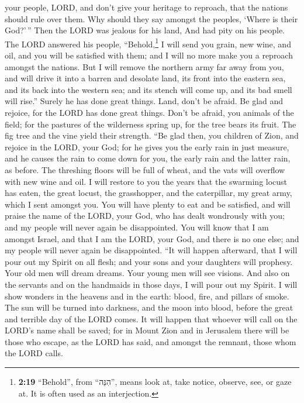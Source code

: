 your people, LORD, and don't give your heritage to reproach, that the
nations should rule over them. Why should they say amongst the peoples,
`Where is their God?'\,''  Then the LORD was jealous for
his land, And had pity on his people.  The LORD answered
his people, ``Behold,\footnote{\textbf{2:19} ``Behold'', from
  ``הִנֵּה'', means look at, take notice, observe, see, or gaze at. It
  is often used as an interjection.} I will send you grain, new wine,
and oil, and you will be satisfied with them; and I will no more make
you a reproach amongst the nations.  But I will remove
the northern army far away from you, and will drive it into a barren and
desolate land, its front into the eastern sea, and its back into the
western sea; and its stench will come up, and its bad smell will rise.''
Surely he has done great things.  Land, don't be afraid.
Be glad and rejoice, for the LORD has done great things. 
Don't be afraid, you animals of the field; for the pastures of the
wilderness spring up, for the tree bears its fruit. The fig tree and the
vine yield their strength.  ``Be glad then, you children
of Zion, and rejoice in the LORD, your God; for he gives you the early
rain in just measure, and he causes the rain to come down for you, the
early rain and the latter rain, as before.  The threshing
floors will be full of wheat, and the vats will overflow with new wine
and oil.  I will restore to you the years that the
swarming locust has eaten, the great locust, the grasshopper, and the
caterpillar, my great army, which I sent amongst you. 
You will have plenty to eat and be satisfied, and will praise the name
of the LORD, your God, who has dealt wondrously with you; and my people
will never again be disappointed.  You will know that I
am amongst Israel, and that I am the LORD, your God, and there is no one
else; and my people will never again be disappointed. 
``It will happen afterward, that I will pour out my Spirit on all flesh;
and your sons and your daughters will prophesy. Your old men will dream
dreams. Your young men will see visions.  And also on the
servants and on the handmaids in those days, I will pour out my Spirit.
 I will show wonders in the heavens and in the earth:
blood, fire, and pillars of smoke.  The sun will be
turned into darkness, and the moon into blood, before the great and
terrible day of the LORD comes.  It will happen that
whoever will call on the LORD's name shall be saved; for in Mount Zion
and in Jerusalem there will be those who escape, as the LORD has said,
and amongst the remnant, those whom the LORD calls.

